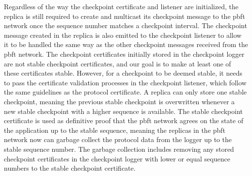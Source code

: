 Regardless of the way the checkpoint certificate and listener are initialized, the replica is still required to create and multicast its checkpoint message to the \ac{pbft} network once the sequence number matches a checkpoint interval. The checkpoint message created in the replica is also emitted to the checkpoint listener to allow it to be handled the same way as the other checkpoint messages received from the \ac{pbft} network. The checkpoint certificates initially stored in the checkpoint logger are not stable checkpoint certificates, and our goal is to make at least one of these certificates stable. However, for a checkpoint to be deemed stable, it needs to pass the certificate validation processes in the checkpoint listener, which follow the same guidelines as the protocol certificate. A replica can only store one stable checkpoint, meaning the previous stable checkpoint is overwritten whenever a new stable checkpoint with a higher sequence is available. 
The stable checkpoint certificate is used as definitive proof that the \ac{pbft} network agrees on the state of the application up to the stable sequence, meaning the replicas in the \ac{pbft} network now can garbage collect the protocol data from the logger up to the stable sequence number. The garbage collection includes removing any stored checkpoint certificates in the checkpoint logger with lower or equal sequence numbers to the stable checkpoint certificate.


